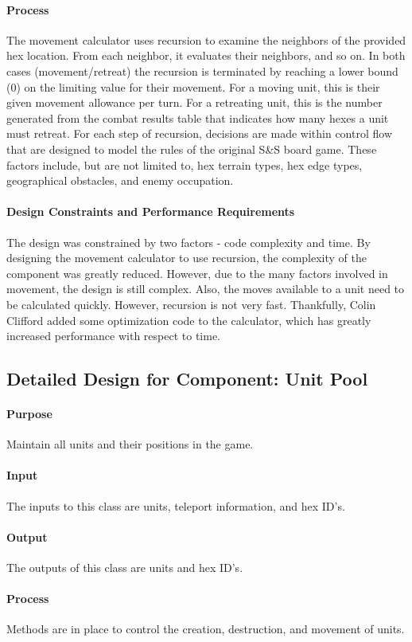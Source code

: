 \documentclass[12pt,a4paper,titlepage]{article}
\begin{document}
\paragraph{Process} The movement calculator uses recursion to examine the neighbors of the provided hex location. From each neighbor, it evaluates their neighbors, and so on. In both cases (movement/retreat) the recursion is terminated by reaching a lower bound (0) on the limiting value for their movement. For a moving unit, this is their given movement allowance per turn. For a retreating unit, this is the number generated from the combat results table that indicates how many hexes a unit must retreat. For each step of recursion, decisions are made within control flow that are designed to model the rules of the original S\&S board game. These factors include, but are not limited to, hex terrain types, hex edge types, geographical obstacles, and enemy occupation. 
\paragraph{Design Constraints and Performance Requirements} The design was constrained by two factors - code complexity and time. By designing the movement calculator to use recursion, the complexity of the component was greatly reduced. However, due to the many factors involved in movement, the design is still complex. Also, the moves available to a unit need to be calculated quickly. However, recursion is not very fast. Thankfully, Colin Clifford added some optimization code to the calculator, which has greatly increased performance with respect to time.
\subsection{Detailed Design for Component: Unit Pool}
\paragraph{Purpose} Maintain all units and their positions in the game.
\paragraph{Input} The inputs to this class are units, teleport information, and hex ID's.
\paragraph{Output} The outputs of this class are units and hex ID's. 
\paragraph{Process} Methods are in place to control the creation, destruction, and movement of units.
\end{document}

